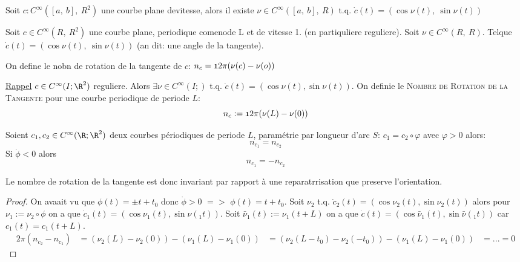 \begin{lemme}
	Soit $c:C^\infty([a,\ b],\ R^2)$ une courbe plane devitesse, alors il existe $\nu\in C^\infty([a,\ b],\ R)$ t.q. $\dot{c}(t)=(\cos\nu(t),\ \sin\nu(t))$
\end{lemme}

\begin{definition}
	Soit $c\in C^\infty(R,\ R^2)$ une courbe plane, periodique comenode L et de vitesse 1. (en partiquliere reguliere). Soit $\nu\in C^\infty(R,\ R)$.
	Telque $\dot{c}(t)=(\cos \nu (t),\ \sin\nu(t))$ (an dit: une angle de la tangente).
	
	On define le nobn de rotation de la tangente de $c$: $n_c=\frak{1}{2\pi}(\nu(c)-\nu(o))$
\end{definition}

\underline{Rappel} $c\in C^\infty(I; \R^2)$ reguliere. Alors $\exists\nu\in C^\infty (I; )$ t.q. $\dot{c}(t)=(\cos \nu(t), \sin\nu(t))$. On definie le \textsc{Nombre de Rotation de la Tangente} pour une courbe periodique de periode $L$:
	$$n_c:=\frak{1}{2\pi}(\nu (L)-\nu(0))$$
	
\begin{lemme}
	Soient $c_1, c_2\in C^\infty (\R; \R^2)$ deux courbes périodiques de periode $L$, paramétrie par longueur d'arc $S$: $c_1=c_2\circ\varphi$ avec $\varphi>0 $ alors:
	$$n_{c_1}=n_{c_2}$$
	Si $\dot{\phi}<0$ alors
	$$n_{c_1}=-n_{c_2}$$
\end{lemme}
\begin{remark}
	Le nombre de rotation de la tangente est donc invariant par rapport à une reparatrrisation que preserve l'orientation.
\end{remark}
\begin{proof}
	On avaait vu que $\phi(t)=\pm t+t_0$ donc $\dot{\phi}>0$ $=>$ $\phi (t)=t+t_0$. Soit $\nu_2$ t.q. $\dot{c}_2(t)=(\cos\nu_2(t), \sin\nu_2(t))$ alors pour $\nu_1:=\nu_2\circ\phi$ on a que $\dot{c}_1(t)=(\cos\nu_1(t), \sin\nu(_1t))$. Soit $\bar{\nu}_1(t):=\nu_1(t+L)$ on a que $\dot{c}(t)=(\cos\bar{\nu}_1(t), \sin\bar{\nu}(_1t))$ car $c_1(t)=c_1(t+L)$.
	\begin{align}
		2\pi(n_{c_2}-n_{c_1}) & = (\nu_2(L)-\nu_2(0))-(\nu_1(L)-\nu_1(0))
				& =(\nu_2(L-t_0)-\nu_2(-t_0)) - (\nu_1(L)-\nu_1(0))
				& = ...
				=0
	\end{align}
\end{proof}

